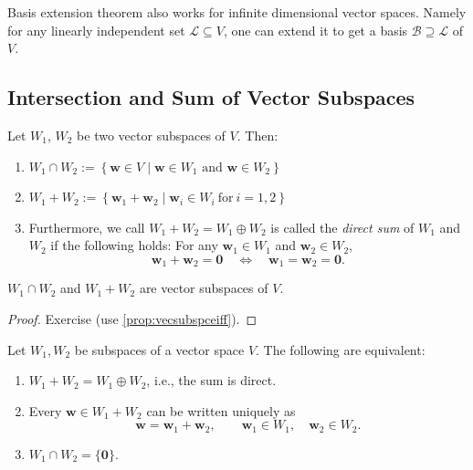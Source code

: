 \begin{remark}
    Basis extension theorem also works for infinite dimensional vector spaces. Namely for any linearly independent set $\mathcal L \subseteq V$, one can extend it to get a basis $\mathcal B \supseteq \mathcal L$ of $V$.
\end{remark}

\subsection{Intersection and Sum of Vector Subspaces}

\begin{definition} \label{def:sumintersect} Let \(W_1\), \(W_2\) be two vector subspaces of \(V\). Then:

\begin{enumerate}
  \item \(W_1 \cap W_2 := \left\{ \mathbf{w} \in V \mid \mathbf{w} \in W_1 \text{ and } \mathbf{w} \in W_2 \right\}\)

  \item \(W_1 + W_2 := \left\{ \mathbf{w}_1 + \mathbf{w}_2 \mid \mathbf{w}_i \in W_i\ \text{for}\ i = 1,2 \right\}\)

  \item Furthermore, we call \(W_1 + W_2 = W_1 \oplus W_2\) is called the \emph{direct sum} of $W_1$ and $W_2$ if the following holds: For any \( \mathbf{w}_1 \in W_1 \) and \( \mathbf{w}_2 \in W_2 \), 
$$\mathbf{w}_1 + \mathbf{w}_2 = \mathbf{0} \quad \Leftrightarrow \quad \mathbf{w}_1 = \mathbf{w}_2 = \mathbf{0}.$$
\end{enumerate}
\end{definition}

\begin{proposition}
\(W_1 \cap W_2\) and \(W_1 + W_2\) are vector subspaces of \(V\).
\end{proposition}
\begin{proof}
    Exercise (use \autoref{prop:vecsubspceiff}).
\end{proof}

\begin{proposition}
Let \(W_1,W_2\) be subspaces of a vector space \(V\). The following are equivalent:
\begin{enumerate}
    \item \(W_1+W_2=W_1\oplus W_2\), i.e., the sum is direct.
    \item Every \(\mathbf w\in W_1+W_2\) can be written uniquely as
    \[
    \mathbf w=\mathbf w_1+\mathbf w_2,
    \qquad
    \mathbf w_1\in W_1,\quad \mathbf w_2\in W_2.
    \]
    \item \(W_1\cap W_2=\{\mathbf 0\}\).
\end{enumerate}
\end{proposition}

